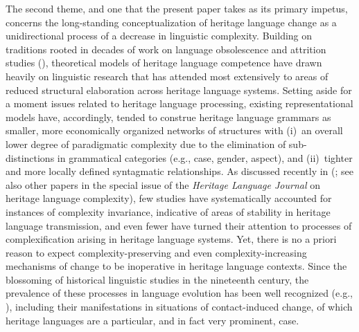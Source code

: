 \documentclass[output=paper]{langscibook}
\begin{document}
The second theme, and one that the present paper takes as its primary impetus, concerns the long-standing conceptualization of heritage language change as a unidirectional process of a decrease in linguistic complexity. Building on traditions rooted in decades of work on language obsolescence and attrition studies (\citealt{Dorian1989, Sasse2001}), theoretical models of heritage language competence have drawn heavily on linguistic research that has attended most extensively to areas of reduced structural elaboration across heritage language systems. Setting aside for a moment issues related to heritage language processing, existing representational models have, accordingly, tended to construe heritage language grammars as smaller, more economically organized networks of structures with (i)~an overall lower degree of paradigmatic complexity due to the elimination of sub-distinctions in grammatical categories (e.g., case, gender, aspect), and (ii)~tighter and more locally defined syntagmatic relationships. As discussed recently in \citeauthor{LalekoScontras2021} (\citeyear{LalekoScontras2021}; see also other papers in the special issue of the \textit{Heritage Language Journal} on heritage language complexity), few studies have systematically accounted for instances of complexity invariance, indicative of areas of stability in heritage language transmission, and even fewer have turned their attention to processes of complexification arising in heritage language systems. Yet, there is no a priori reason to expect complexity-preserving and even complexity-increasing mechanisms of change to be inoperative in heritage language contexts. Since the blossoming of historical linguistic studies in the nineteenth century, the prevalence of these processes in language evolution has been well recognized (e.g., \citealt{Lightfoot1991}), including their manifestations in situations of contact-induced change, of which heritage languages are a particular, and in fact very prominent, case.
\end{document}
